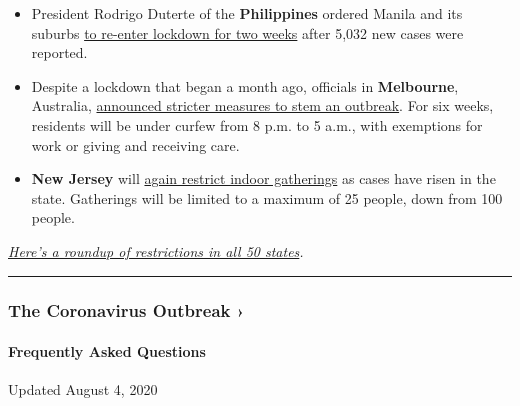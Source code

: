 \begin{itemize}
\item
  President Rodrigo Duterte of the \textbf{Philippines} ordered Manila
  and its suburbs
  \href{https://www.nytimes3xbfgragh.onion/2020/08/03/world/coronavirus-covid-19.html\#link-284aa099}{to
  re-enter lockdown for two weeks} after 5,032 new cases were reported.
\item
  Despite a lockdown that began a month ago, officials in
  \textbf{Melbourne}, Australia,
  \href{https://www.dw.com/en/australia-melbourne-enters-tough-new-lockdown-and-curfew/a-54408689}{announced
  stricter measures to stem an outbreak}. For six weeks, residents will
  be under curfew from 8 p.m. to 5 a.m., with exemptions for work or
  giving and receiving care.
\item
  \textbf{New Jersey} will
  \href{https://www.nytimes3xbfgragh.onion/2020/08/03/world/coronavirus-covid-19.html\#link-6c117b4e}{again
  restrict indoor gatherings} as cases have risen in the state.
  Gatherings will be limited to a maximum of 25 people, down from 100
  people.
\end{itemize}

\href{https://www.nytimes3xbfgragh.onion/interactive/2020/us/states-reopen-map-coronavirus.html}{\emph{Here's
a roundup of restrictions in all 50 states}}\emph{.}

\begin{center}\rule{0.5\linewidth}{\linethickness}\end{center}

\href{https://www.nytimes3xbfgragh.onion/news-event/coronavirus?action=click\&pgtype=Article\&state=default\&region=MAIN_CONTENT_3\&context=storylines_faq}{}

\hypertarget{the-coronavirus-outbreak-}{%
\subsubsection{The Coronavirus Outbreak
›}\label{the-coronavirus-outbreak-}}

\hypertarget{frequently-asked-questions}{%
\paragraph{Frequently Asked
Questions}\label{frequently-asked-questions}}

Updated August 4, 2020

